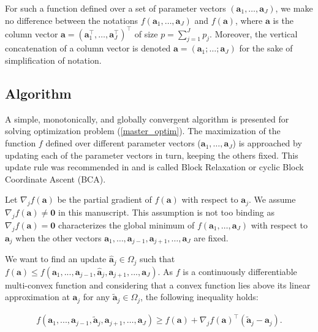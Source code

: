\documentclass[
]{jss}
\begin{document}
For such a function defined over a set of parameter vectors
\(( \mathbf a_1, \ldots, \mathbf a_J)\), we make no difference between
the notations \(f( \mathbf a_1, \ldots, \mathbf a_J)\) and
\(f( \mathbf a)\), where \(\mathbf a\) is the column vector
\(\mathbf a = \left( \mathbf a_1^\top, \ldots, \mathbf a_J^\top\right)^\top\)
of size \(p = \sum_{j=1}^{J}p_j\). Moreover, the vertical concatenation
of a column vector is denoted
\(\mathbf a = \left( \mathbf a_1; \ldots; \mathbf a_J \right)\) for the
sake of simplification of notation.

\hypertarget{algorithm}{%
\subsection{Algorithm}\label{algorithm}}

A simple, monotonically, and globally convergent algorithm is presented
for solving optimization problem (\ref{master_optim}). The maximization
of the function \(f\) defined over different parameter vectors
(\(\mathbf a_1, \ldots, \mathbf a_J\)) is approached by updating each of
the parameter vectors in turn, keeping the others fixed. This update
rule was recommended in \cite{DeLeeuw1994} and is called Block
Relaxation or cyclic Block Coordinate Ascent (BCA).

Let \(\nabla_j f( \mathbf a)\) be the partial gradient of
\(f( \mathbf a)\) with respect to \(\mathbf a_j\). We assume
\(\nabla_j f( \mathbf a) \neq \mathbf{0}\) in this manuscript. This
assumption is not too binding as \(\nabla_j f( \mathbf a) = \mathbf{0}\)
characterizes the global minimum of
\(f( \mathbf a_1 , \ldots , \mathbf a_J )\) with respect to
\(\mathbf a_j\) when the other vectors
\(\mathbf a_1 , \ldots , \mathbf a_{j-1} , \mathbf a_{j+1} , \ldots , \mathbf a_J\)
are fixed.

We want to find an update \(\hat{ \mathbf a}_j\in \Omega_j\) such that
\(f( \mathbf a)\leq f( \mathbf a_1, ..., \mathbf a_{j-1}, \hat{ \mathbf a}_j, \mathbf a_{j+1}, ..., \mathbf a_J)\).
As \(f\) is a continuously differentiable multi-convex function and
considering that a convex function lies above its linear approximation
at \(\mathbf a_j\) for any \(\tilde{ \mathbf a}_j\in\Omega_j\), the
following inequality holds:

\begin{equation}
\begin{gathered}
f( \mathbf a_1, ...,  \mathbf a_{j-1}, \tilde{ \mathbf a}_j,  \mathbf a_{j+1}, \ldots,  \mathbf a_J) \geq f( \mathbf a) + \nabla_jf( \mathbf a)^\top(\tilde{ \mathbf a}_j -  \mathbf a_j).
\label{minorizing_ineq}
\end{gathered}
\end{equation}
\end{document}
